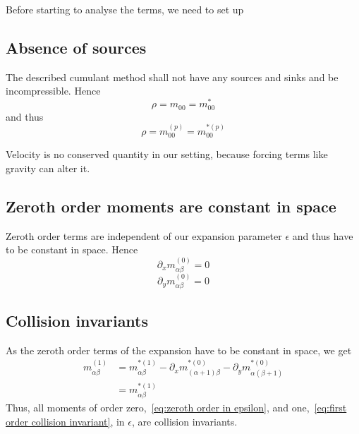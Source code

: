 
Before starting to analyse the terms, we need to set up
\subsection{Absence of sources}
\label{sub:Absence of sources}
The described cumulant method shall not have any sources and sinks and be incompressible. Hence
\begin{equation}
    \rho  = m_{00} = m_{00}^*
\end{equation}
and thus
\begin{equation}
    \rho = m_{00}^{(p)} = m_{00}^{*(p)}
\end{equation}

Velocity is no conserved quantity in our setting, because forcing terms like gravity can alter it.

\subsection{Zeroth order moments are constant in space}
\label{sub:Zeroth order moments are constant in space}
Zeroth order terms are independent of our expansion parameter $\epsilon$ and thus have to be constant in space. Hence
\begin{equation}
  \partial_x m_{\alpha\beta}^{(0)} = 0
\end{equation}
\begin{equation}
  \partial_y m_{\alpha\beta}^{(0)} = 0
\end{equation}


\subsection{Collision invariants}
\label{sub:Collision invariants}
As the zeroth order terms of the expansion have to be constant in space, we get
\begin{equation}
  \label{eq:first order collision invariant}
  \begin{aligned}
    m_{\alpha\beta}^{(1)}
    & = m_{\alpha\beta}^{*(1)}
    - \partial_x m_{(\alpha+1)\beta}^{*(0)}
    - \partial_y m_{\alpha(\beta+1)}^{*(0)} \\
    & = m_{\alpha\beta}^{*(1)}
  \end{aligned}
\end{equation}
Thus, all moments of order zero,~\eqref{eq:zeroth order in epsilon},
and one,~\eqref{eq:first order collision invariant}, in $\epsilon$, are collision invariants.

